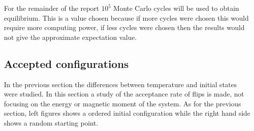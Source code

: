 For the remainder of the report $10^5$ Monte Carlo cycles will be used to obtain equilibrium. This is a value chosen because if more cycles were chosen this would require more computing power, if less cycles were chosen then the results would not give the approximate expectation value. 












\subsection{Accepted configurations}

In the previous section the differences between temperature and initial states were studied. In this section a study of the acceptance rate of flips is made, not focusing on the energy or magnetic moment of the system. As for the previous section, left figures shows a ordered initial configuration while the right hand side shows a random starting point.

